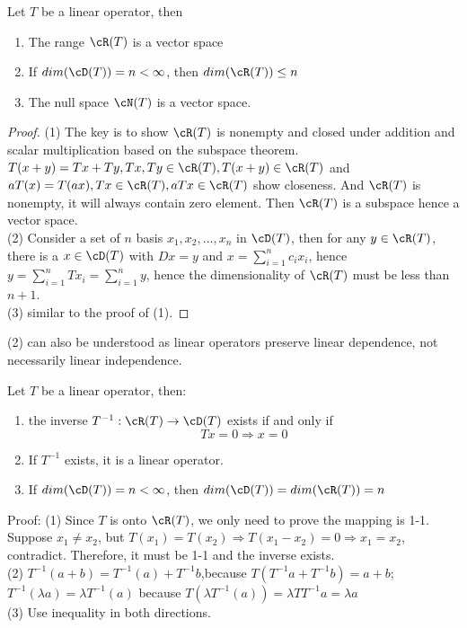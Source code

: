 \begin{refsection}
\begin{theorem}
\cite[85]{kreyszig1989introductory}Let $T$ be a linear operator, then
\begin{enumerate}
\item The range $\cR(T)$ is a vector space
\item If $dim(\cD(T))=n < \infty$, then $dim(\cR(T)) \leq n$
\item The null space $\cN(T)$ is a vector space.
\end{enumerate}
\end{theorem}
\begin{proof}
(1) The key is to show $\cR(T)$ is nonempty and closed under addition and scalar multiplication based on the subspace theorem. $T(x+y) = Tx + Ty, Tx,Ty \in \cR(T), T(x+y)\in \cR(T)$ and $aT(x) = T(ax), Tx \in \cR(T), aTx \in \cR(T)$ show closeness. And $\cR(T)$ is nonempty, it will always contain zero element. Then $\cR(T)$ is a subspace hence a vector space. \\(2) Consider a set of $n$ basis $x_1,x_2,...,x_n$ in $\cD(T)$, then for any $y \in \cR(T)$, there is a $x \in \cD(T)$ with $Dx = y$ and $x = \sum_{i=1}^n c_i x_i$, hence $y = \sum_{i=1}^n Tx_i = \sum_{i=1}^n y$, hence the dimensionality of $\cR(T)$ must be less than $n+1$.\\(3) similar to the proof of (1).	
\end{proof}


\begin{remark}
(2) can also be understood as linear operators preserve linear dependence, not necessarily linear independence.
\end{remark}

\begin{theorem}
\cite[88]{kreyszig1989introductory} Let $T$ be a linear operator, then:
\begin{enumerate}
\item the inverse $T^{-1}: \cR(T)\to \cD(T)$ exists if and only if $$Tx = 0 \Rightarrow x = 0$$
\item If $T^{-1}$ exists, it is a linear operator.
\item If $dim(\cD(T))=n < \infty$, then $dim(\cD(T))=dim(\cR(T)) = n$
\end{enumerate}
\end{theorem}
Proof: (1) Since $T$ is onto $\cR(T)$, we only need to prove the mapping is 1-1. Suppose $x_1\neq x_2$, but $T(x_1)=T(x_2) \Rightarrow T(x_1-x_2)=0 \Rightarrow x_1=x_2$, contradict. Therefore, it must be 1-1 and the inverse exists. \\
(2) $T^{-1}(a+b) = T^{-1}(a) + T^{-1}b$,because $T(T^{-1}a + T^{-1}b) = a + b$;  $T^{-1}(\lambda a) = \lambda T^{-1}(a)$ because $T(\lambda T^{-1}(a)) = \lambda TT^{-1}a = \lambda a$\\
(3) Use inequality in both directions.  


\end{refsection}
